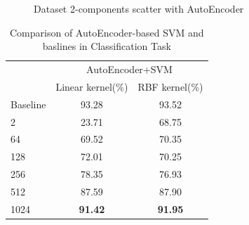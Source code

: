 \documentclass{article}
\begin{document}
	\begin{center}
	\begin{figure}[htbp]
	\centering
	\quad
	\caption{Dataset 2-components scatter with AutoEncoder}
	\label{Fig6}
	\end{figure}
\end{center}

\begin{table}[htbp]
	\centering
	\newcommand{\tabincell}[2]{\begin{tabular}{@{}#1@{}}#2\end{tabular}}
	\renewcommand\arraystretch{1.0}
	\caption{Comparison of AutoEncoder-based SVM and baslines in Classification Task}
	\label{baseline3}%
	\begin{tabular}{@{}p{2.5cm}<{\centering}|c|c}
		\hline
		\multirow{2}{*}{\diagbox[height=2\line,width=2.9cm,font=\tiny]{$d$}{Acc.}{$\mathit{M}$}} &\multicolumn{2}{c}{AutoEncoder+SVM}\\
		\cline{2-3}
			& {Linear kernel(\%)} & {RBF kernel(\%)}\\
		\hline
		Baseline & 93.28 & 93.52\\
		\hline
		2   & 23.71 & 68.75\\
		\hline
		64   & 69.52 & 70.35\\
		\hline
		128   & 72.01 & 70.25\\
		\hline
		256   & 78.35 & 76.93\\
		\hline
		512   & 87.59 & 87.90\\
		\hline
		1024   & \textbf{91.42} & \textbf{91.95}\\
		\hline
	\end{tabular}
\end{table}
\end{document}
